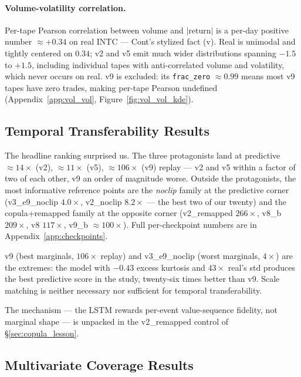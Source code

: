 \documentclass[journal]{IEEEtran}
\theoremstyle{definition}   %
\begin{document}
\paragraph{Volume-volatility correlation.}
Per-tape Pearson correlation between volume and $|\text{return}|$
is a per-day positive number $\approx +0.34$ on real INTC ---
Cont's stylized fact (v). Real is unimodal and tightly centered on
$0.34$; v2 and v5 emit much wider distributions spanning $-1.5$ to
$+1.5$, including individual tapes with anti-correlated volume and
volatility, which never occurs on real. v9 is excluded: its
\texttt{frac\_zero} $\approx 0.99$ means most v9 tapes have zero
trades, making per-tape Pearson undefined
(Appendix~\ref{app:vol_vol}, Figure~\ref{fig:vol_vol_kde}).

\subsection{Temporal Transferability Results}
\label{sec:res_predictive}

The headline ranking surprised us. The three protagonists land at
predictive $\approx 14\times$ (v2), $\approx 11\times$ (v5),
$\approx 106\times$ (v9) replay --- v2 and v5 within a factor of
two of each other, v9 an order of magnitude worse. Outside the
protagonists, the most informative reference points are the
\emph{noclip} family at the predictive corner (v3\_e9\_noclip
$4.0\times$, v2\_noclip $8.2\times$ --- the best two of our
twenty) and the copula+remapped family at the opposite corner
(v2\_remapped $266\times$, v8\_b $209\times$, v8 $117\times$,
v9\_b $\approx 100\times$). Full per-checkpoint numbers are in
Appendix~\ref{app:checkpoints}.

v9 (best marginals, $106\times$ replay) and v3\_e9\_noclip (worst
marginals, $4\times$) are the extremes: the model with $-0.43$
excess kurtosis and $43\times$ real's std produces the best
predictive score in the study, twenty-six times better than v9.
Scale matching is neither necessary nor sufficient for temporal
transferability.

The mechanism --- the LSTM rewards per-event value-sequence
fidelity, not marginal shape --- is unpacked in the v2\_remapped
control of \S\ref{sec:copula_lesson}.

\subsection{Multivariate Coverage Results}
\label{sec:res_pca}
\end{document}
